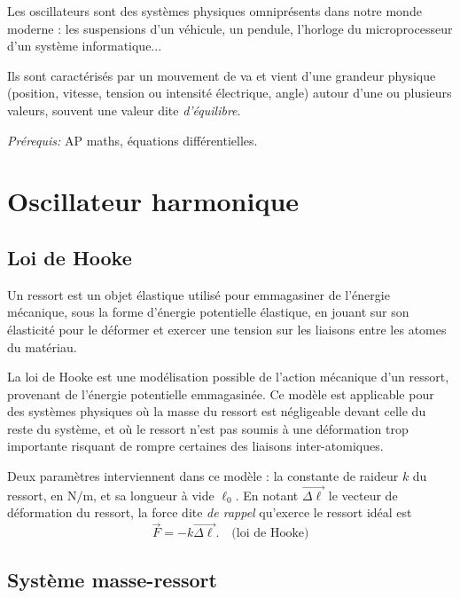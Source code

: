 \documentclass[../main]{subfiles}
\begin{document}

    Les oscillateurs sont des systèmes physiques omniprésents dans notre monde moderne : les suspensions d'un véhicule, un pendule, l'horloge du microprocesseur d'un système informatique...

    Ils sont caractérisés par un mouvement de va et vient d'une grandeur physique (position, vitesse, tension ou intensité électrique, angle) autour d'une ou plusieurs valeurs, souvent une valeur dite \textit{d'équilibre}.

\noindent\textit{Prérequis:} AP maths, équations différentielles.

\section{Oscillateur harmonique}

\subsection{Loi de Hooke}

Un ressort est un objet élastique utilisé pour emmagasiner de l'énergie mécanique, sous la forme d'énergie potentielle élastique, en jouant sur son élasticité pour le déformer et exercer une tension sur les liaisons entre les atomes du matériau.

La loi de Hooke est une modélisation possible de l'action mécanique d'un ressort, provenant de l'énergie potentielle emmagasinée. Ce modèle est applicable pour des systèmes physiques où la masse du ressort est négligeable devant celle du reste du système, et où le ressort n'est pas soumis à une déformation trop importante risquant de rompre certaines des liaisons inter-atomiques.

Deux paramètres interviennent dans ce modèle : la constante de raideur $k$ du ressort, en $\si{\newton\per\metre} $, et sa longueur à vide $\ell_0$. En notant $\vec{\Delta\ell}$ le vecteur de déformation du ressort, la force dite \textit{de rappel} qu'exerce le ressort idéal est
	\[
    \vec{F} = -k\vec{\Delta\ell}. \quad \text{(loi de Hooke)}
    \]

\subsection{Système masse-ressort}
\end{document}
